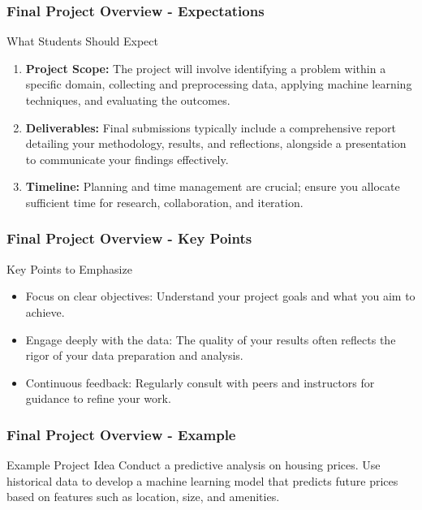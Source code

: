 \documentclass{beamer}
\begin{document}
\begin{frame}[fragile]
    \frametitle{Final Project Overview - Expectations}
    \begin{block}{What Students Should Expect}
        \begin{enumerate}
            \item \textbf{Project Scope:} 
            The project will involve identifying a problem within a specific domain, collecting 
            and preprocessing data, applying machine learning techniques, and evaluating the outcomes.
            
            \item \textbf{Deliverables:} 
            Final submissions typically include a comprehensive report detailing your methodology, 
            results, and reflections, alongside a presentation to communicate your findings effectively.
            
            \item \textbf{Timeline:} 
            Planning and time management are crucial; ensure you allocate sufficient time for 
            research, collaboration, and iteration.
        \end{enumerate}
    \end{block}
\end{frame}

\begin{frame}[fragile]
    \frametitle{Final Project Overview - Key Points}
    \begin{block}{Key Points to Emphasize}
        \begin{itemize}
            \item Focus on clear objectives: 
            Understand your project goals and what you aim to achieve.
            
            \item Engage deeply with the data: 
            The quality of your results often reflects the rigor of your data preparation and analysis.
            
            \item Continuous feedback: 
            Regularly consult with peers and instructors for guidance to refine your work.
        \end{itemize}
    \end{block}
\end{frame}

\begin{frame}[fragile]
    \frametitle{Final Project Overview - Example}
    \begin{block}{Example Project Idea}
        Conduct a predictive analysis on housing prices. Use historical data to develop a machine 
        learning model that predicts future prices based on features such as location, size, 
        and amenities.
    \end{block}
\end{frame}
\end{document}
